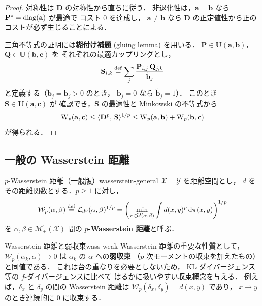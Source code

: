 \begin{proof}
対称性は $\mathbf{D}$ の対称性から直ちに従う．
非退化性は，$\mathbf{a} = \mathbf{b}$ なら
$\mathbf{P}^\star = \operatorname{diag}(\mathbf{a})$ が最適で
コスト 0 を達成し，
$\mathbf{a} \neq \mathbf{b}$ なら
$\mathbf{D}$ の正定値性から正のコストが必ず生じることによる．

三角不等式の証明には\textbf{糊付け補題} (gluing lemma) を用いる．
$\mathbf{P} \in \mathbf{U}(\mathbf{a}, \mathbf{b})$，
$\mathbf{Q} \in \mathbf{U}(\mathbf{b}, \mathbf{c})$ を
それぞれの最適カップリングとし，
\[
  \mathbf{S}_{i,k} \overset{\mathrm{def}}{=}
  \sum_{j} \frac{\mathbf{P}_{i,j}\, \mathbf{Q}_{j,k}}{\tilde{\mathbf{b}}_j}
\]
と定義する（$\tilde{\mathbf{b}}_j = \mathbf{b}_j > 0$ のとき，
$\mathbf{b}_j = 0$ なら $\tilde{\mathbf{b}}_j = 1$）．
このとき $\mathbf{S} \in \mathbf{U}(\mathbf{a}, \mathbf{c})$ が
確認でき，$\mathbf{S}$ の最適性と Minkowski の不等式から
\[
  \mathrm{W}_p(\mathbf{a}, \mathbf{c})
  \leq \langle \mathbf{D}^p,\, \mathbf{S} \rangle^{1/p}
  \leq \mathrm{W}_p(\mathbf{a}, \mathbf{b})
  + \mathrm{W}_p(\mathbf{b}, \mathbf{c})
\]
が得られる．
\end{proof}

\subsection{一般の Wasserstein 距離}\label{subsec:wasserstein-general}

\begin{definition}{$p$-Wasserstein 距離（一般版）}{wasserstein-general}
$\mathcal{X} = \mathcal{Y}$ を距離空間とし，
$d$ をその距離関数とする．$p \geq 1$ に対し，
\begin{equation}\label{eq:wasserstein-general}
  \mathcal{W}_p(\alpha, \beta)
  \overset{\mathrm{def}}{=} \mathcal{L}_{d^p}(\alpha, \beta)^{1/p}
  = \left(
    \min_{\pi \in \mathcal{U}(\alpha, \beta)}
    \int d(x, y)^p\, \mathrm{d}\pi(x, y)
  \right)^{1/p}
\end{equation}
を $\alpha, \beta \in \mathcal{M}^1_+(\mathcal{X})$ 間の
\textbf{$p$-Wasserstein 距離}と呼ぶ．
\end{definition}

\begin{remark}{Wasserstein 距離と弱収束}{wass-weak}
Wasserstein 距離の重要な性質として，
$\mathcal{W}_p(\alpha_k, \alpha) \to 0$ は
$\alpha_k$ の $\alpha$ への\textbf{弱収束}
（$p$ 次モーメントの収束を加えたもの）と同値である．
これは台の重なりを必要としないため，
KL ダイバージェンス等の $f$-ダイバージェンスに比べて
はるかに扱いやすい収束概念を与える．
例えば，$\delta_x$ と $\delta_y$ の間の Wasserstein 距離は
$\mathcal{W}_p(\delta_x, \delta_y) = d(x, y)$ であり，
$x \to y$ のとき連続的に $0$ に収束する．
\end{remark}


